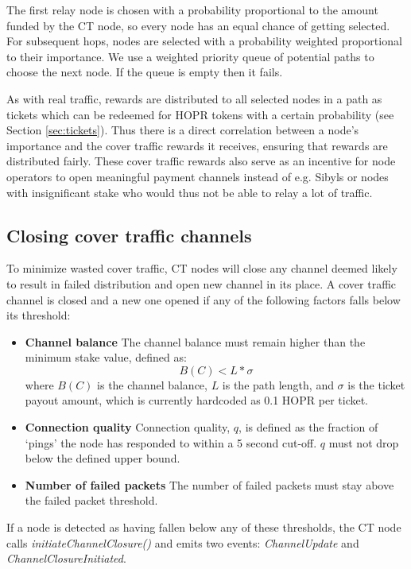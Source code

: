 The first relay node is chosen with a probability proportional to the amount funded by the CT node, so every node has an equal chance of getting selected. For subsequent hops, nodes are selected with a probability weighted proportional to their importance. We use a weighted priority queue of potential paths to choose the next node. If the queue is empty then it fails.

As with real traffic, rewards are distributed to all selected nodes in a path as tickets which can be redeemed for HOPR tokens with a certain probability (see Section \ref{sec:tickets}). Thus there is a direct correlation between a node's importance and the cover traffic rewards it receives, ensuring that rewards are distributed fairly. These cover traffic rewards also serve as an incentive for node operators to open meaningful payment channels instead of e.g. Sibyls or nodes with insignificant stake who would thus not be able to relay a lot of traffic.


\subsection{Closing cover traffic channels}
To minimize wasted cover traffic, CT nodes will close any channel deemed likely to result in failed distribution and open new channel in its place. A cover traffic channel is closed and a new one opened if any of the following factors falls below its threshold:
  \begin{itemize}
      \item \textbf{Channel balance} The channel balance must remain higher than the minimum stake value, defined as:
      $$B(C) < L * \sigma$$
      where $B(C)$ is the channel balance, $L$ is the path length, and $\sigma$ is the ticket payout amount, which is currently hardcoded as 0.1 HOPR per ticket.
      \item \textbf{Connection quality} Connection quality, $q$, is defined as the fraction of `pings' the node has responded to within a 5 second cut-off. $q$ must not drop below the defined upper bound. 
      \item \textbf{Number of failed packets} The number of failed packets must stay above the failed packet threshold.
      $$ $$
  \end{itemize}
If a node is detected as having fallen below any of these thresholds, the CT node calls \textit{initiateChannelClosure()} and emits two events: \textit{ChannelUpdate} and \textit{ChannelClosureInitiated}.
